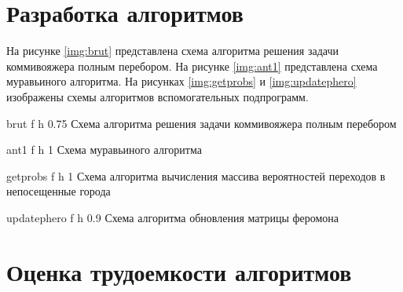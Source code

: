 \section{Разработка алгоритмов}

На рисунке \ref{img:brut} представлена схема алгоритма решения задачи коммивояжера полным перебором. На рисунке \ref{img:ant1} представлена схема муравьиного алгоритма. На рисунках \ref{img:getprobs} и \ref{img:updatephero} изображены схемы алгоритмов вспомогательных подпрограмм.

\clearpage

{brut} %
{f} %
{h} %
{0.75\textwidth} %
{Схема алгоритма решения задачи коммивояжера полным перебором} %

\clearpage

{ant1} %
{f} %
{h} %
{1\textwidth} %
{Схема муравьиного алгоритма} %


\clearpage

{getprobs} %
{f} %
{h} %
{1\textwidth} %
{Схема алгоритма вычисления массива вероятностей переходов в непосещенные города} %


\clearpage

{updatephero} %
{f} %
{h} %
{0.9\textwidth} %
{Схема алгоритма обновления матрицы феромона} %

\clearpage

\section{Оценка трудоемкости алгоритмов}


